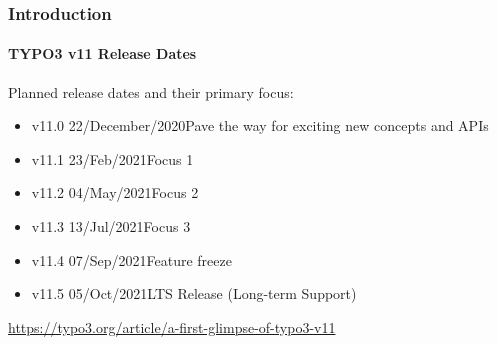
\begin{frame}[fragile]
	\frametitle{Introduction}
	\framesubtitle{TYPO3 v11 Release Dates}

	Planned release dates and their primary focus:

	\begin{itemize}
		\item
			\begingroup
				\color{typo3orange}
				v11.0 \tabto{1.1cm}22/December/2020\tabto{3.4cm}Pave the way for exciting new concepts and APIs
			\endgroup
		\item v11.1 \tabto{1.1cm}23/Feb/2021\tabto{3.4cm}Focus 1
		\item v11.2 \tabto{1.1cm}04/May/2021\tabto{3.4cm}Focus 2
		\item v11.3 \tabto{1.1cm}13/Jul/2021\tabto{3.4cm}Focus 3
		\item v11.4 \tabto{1.1cm}07/Sep/2021\tabto{3.4cm}Feature freeze
		\item v11.5 \tabto{1.1cm}05/Oct/2021\tabto{3.4cm}LTS Release (Long-term Support)

	\end{itemize}

	\smaller
		\url{https://typo3.org/article/a-first-glimpse-of-typo3-v11}
	\normalsize

\end{frame}

